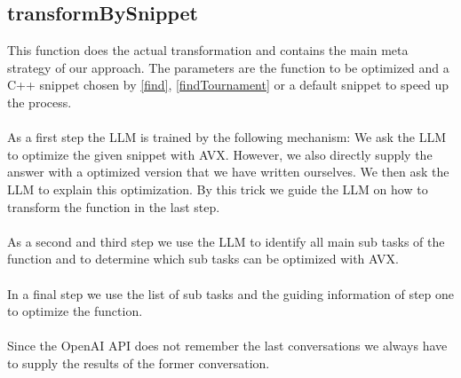 \documentclass[twocolumn]{article}
\begin{document}
\subsection{transformBySnippet} \label{transform}
This function does the actual transformation and contains the main meta strategy of our approach. The parameters are the function to be optimized and a C++ snippet chosen by \ref{find}, \ref{findTournament} or a default snippet to speed up the process.\\
\\
As a first step the LLM is trained by the following mechanism: We ask the LLM to optimize the given snippet with AVX. However, we also directly supply the answer with a optimized version that we have written ourselves. We then ask the LLM to explain this optimization. By this trick we guide the LLM on how to transform the function in the last step.\\
\\
As a second and third step we use the LLM to identify all main sub tasks of the function and to determine which sub tasks can be optimized with AVX.\\
\\
In a final step we use the list of sub tasks and the guiding information of step one to optimize the function.\\
\\
Since the OpenAI API does not remember the last conversations we always have to supply the results of the former conversation. 
\end{document}
